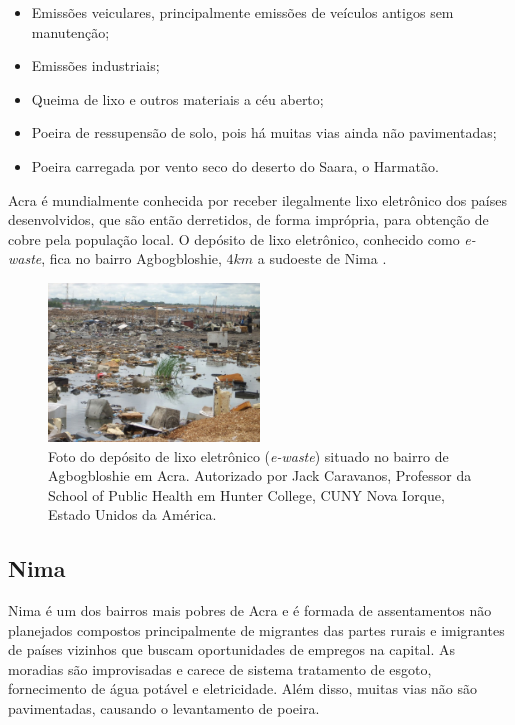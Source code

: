 \begin{itemize}
 \item Emissões veiculares, principalmente emissões de veículos antigos sem 
       manutenção;
 \item Emissões industriais;
 \item Queima de lixo e outros materiais a céu aberto;
 \item Poeira de ressupensão de solo, pois há muitas vias ainda não pavimentadas;
 \item Poeira carregada por vento seco do deserto do Saara, o Harmatão.
\end{itemize}

Acra é mundialmente conhecida por receber ilegalmente lixo 
eletrônico dos países desenvolvidos, que são então derretidos, de forma
imprópria, para obtenção de cobre pela população local. 
O depósito de lixo eletrônico, conhecido como \textit{e-waste}, 
fica no bairro Agbogbloshie, $4 km$ a sudoeste de Nima
\citep{asampong2015}.

\begin{figure}[H]
  \centering
  \includegraphics[width=0.5\textwidth]{../inputs/images/ewaste_jack_caravano.jpg}
  \caption{Foto do depósito de lixo eletrônico (\textit{e-waste}) situado no bairro 
           de Agbogbloshie em Acra. Autorizado por Jack Caravanos, 
           Professor da School of Public Health em Hunter College, CUNY
           Nova Iorque, Estado Unidos da América. \label{fig:ewaste}}
\end{figure}

\subsection{Nima}

Nima é um dos bairros mais pobres de Acra e é formada de assentamentos não 
planejados compostos principalmente de migrantes das partes rurais e 
imigrantes de países vizinhos que buscam oportunidades de empregos na capital. 
As moradias são improvisadas e carece de sistema tratamento de esgoto, 
fornecimento de água potável e eletricidade. Além disso, muitas vias não são 
pavimentadas, causando o levantamento de poeira. 


